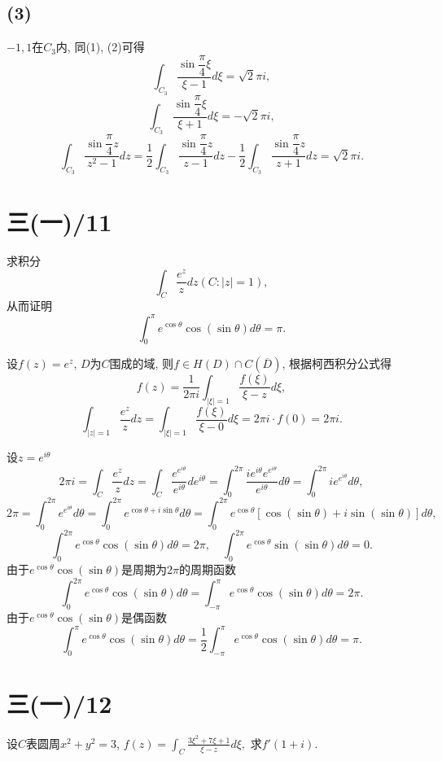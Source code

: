 \documentclass[11pt,a4paper]{article}
\begin{document}
\subsection*{(3)}
$-1,1$在$C_3$内, 同(1), (2)可得
$$\int_{C_3}\frac{\sin\dfrac{\pi}{4}\xi}{\xi-1}d\xi=\sqrt{2}\pi i,$$
$$\int_{C_3}\frac{\sin\dfrac{\pi}{4}\xi}{\xi+1}d\xi=-\sqrt{2}\pi i,$$
$$\int_{C_3}\frac{\sin\dfrac{\pi}{4}z}{z^2-1}dz=\frac{1}{2}\int_{C_3}\frac{\sin\dfrac{\pi}{4}z}{z-1}dz-\frac{1}{2}\int_{C_3}\frac{\sin\dfrac{\pi}{4}z}{z+1}dz=\sqrt{2}\pi i.$$

\section{三(一)/11}
\begin{problem}
求积分$$\int_C\frac{e^z}{z}dz(C:|z|=1),$$
从而证明$$\int_0^\pi e^{\cos\theta}\cos(\sin\theta)d\theta=\pi.$$
\end{problem}

设$f(z)=e^z$, $D$为$C$围成的域, 则$f\in H(D)\cap C(\overline{D})$, 根据柯西积分公式得
$$f(z)=\frac{1}{2\pi i}\int_{|\xi|=1}\frac{f(\xi)}{\xi-z}d\xi,$$
$$\int_{|z|=1}\frac{e^z}{z}dz=\int_{|\xi|=1}\frac{f(\xi)}{\xi-0}d\xi=2\pi i\cdot f(0)=2\pi i.$$

设$z=e^{i\theta}$
$$2\pi i=\int_C\frac{e^z}{z}dz=\int_C\frac{e^{e^{i\theta}}}{e^{i\theta}}de^{i\theta}=\int_0^{2\pi}\frac{ie^{i\theta}e^{e^{i\theta}}}{e^{i\theta}}d\theta=\int_0^{2\pi}ie^{e^{i\theta}}d\theta,$$
$$2\pi=\int_0^{2\pi}e^{e^{i\theta}}d\theta=\int_0^{2\pi}e^{\cos\theta+i\sin\theta}d\theta=\int_0^{2\pi}e^{\cos\theta}[\cos(\sin\theta)+i\sin(\sin\theta)]d\theta,$$
$$\int_0^{2\pi}e^{\cos\theta}\cos(\sin\theta)d\theta=2\pi,\quad \int_0^{2\pi}e^{\cos\theta}\sin(\sin\theta)d\theta=0.$$
由于$e^{\cos\theta}\cos(\sin\theta)$是周期为$2\pi$的周期函数
$$\int_0^{2\pi}e^{\cos\theta}\cos(\sin\theta)d\theta=\int_{-\pi}^{\pi}e^{\cos\theta}\cos(\sin\theta)d\theta=2\pi.$$
由于$e^{\cos\theta}\cos(\sin\theta)$是偶函数
$$\int_{0}^{\pi}e^{\cos\theta}\cos(\sin\theta)d\theta=\frac{1}{2}\int_{-\pi}^{\pi}e^{\cos\theta}\cos(\sin\theta)d\theta=\pi.$$

\section{三(一)/12}
\begin{problem}
设$C$表圆周$x^2+y^2=3$, $\displaystyle f(z)=\int_C\frac{3\xi^2+7\xi+1}{\xi-z}d\xi,$
求$f'(1+i)$.
\end{problem}
\end{document}
